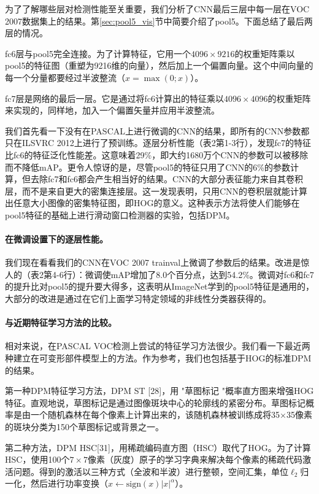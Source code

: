 \documentclass[../main.tex]{subfile}
\begin{document}
为了了解哪些层对检测性能至关重要，我们分析了CNN最后三层中每一层在VOC 2007数据集上的结果。第\ref{sec:pool5_vis}节中简要介绍了pool5。下面总结了最后两层的情况。

fc6层与pool5完全连接。为了计算特征，它用一个$4096\times 9216$的权重矩阵乘以pool5的特征图（重塑为9216维的向量），然后加上一个偏置向量。这个中间向量的每一个分量都要经过半波整流（$x = \max(0; x)$）。

fc7层是网络的最后一层。它是通过将fc6计算出的特征乘以$4096\times 4096$的权重矩阵来实现的，同样地，加入一个偏置矢量并应用半波整流。

我们首先看一下没有在PASCAL上进行微调的CNN的结果，即所有的CNN参数都只在ILSVRC 2012上进行了预训练。逐层分析性能（表2第1-3行），发现fc7的特征比fc6的特征泛化性能差。这意味着29\%，即大约1680万个CNN的参数可以被移除而不降低mAP。更令人惊讶的是，尽管pool5的特征只用了CNN的6\%的参数计算，但去除fc7和fc6都会产生相当好的结果。CNN的大部分表征能力来自其卷积层，而不是来自更大的密集连接层。这一发现表明，只用CNN的卷积层就能计算出任意大小图像的密集特征图，即HOG的意义。这种表示方法将使人们能够在pool5特征的基础上进行滑动窗口检测器的实验，包括DPM。

\paragraph{在微调设置下的逐层性能。}

我们现在看看我们的CNN在VOC 2007 trainval上微调了参数后的结果。改进是惊人的（表2第4-6行）：微调使mAP增加了8.0个百分点，达到54.2\%。微调对fc6和fc7的提升比对pool5的提升要大得多，这表明从ImageNet学到的pool5特征是通用的，大部分的改进是通过在它们上面学习特定领域的非线性分类器获得的。

\paragraph{与近期特征学习方法的比较。}

相对来说，在PASCAL VOC检测上尝试的特征学习方法很少。我们看一下最近两种建立在可变形部件模型上的方法。作为参考，我们也包括基于HOG的标准DPM\cite{dpm}的结果。

第一种DPM特征学习方法，DPM ST [28]，用 "草图标记 "概率直方图来增强HOG特征。直观地说，草图标记是通过图像斑块中心的轮廓线的紧密分布。草图标记概率是由一个随机森林在每个像素上计算出来的，该随机森林被训练成将35×35像素的斑块分类为150个草图标记或背景之一。

第二种方法，DPM HSC[31]，用稀疏编码直方图（HSC）取代了HOG。为了计算HSC，使用100个$7\times 7$像素（灰度）原子的学习字典来解决每个像素的稀疏代码激活问题。得到的激活以三种方式（全波和半波）进行整顿，空间汇集，单位$\ell_2$归一化，然后进行功率变换（$x \gets \text{sign}(x)\vert x \vert^\alpha $）。
\end{document}
